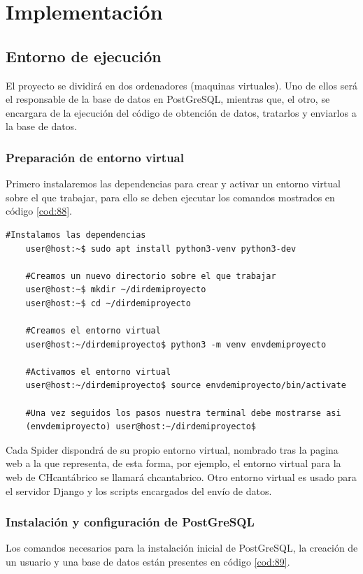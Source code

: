 \chapter[Implementación]{Implementación}
\label{Chap5}

\section{Entorno de ejecución}
El proyecto se dividirá en dos ordenadores (maquinas virtuales). Uno de ellos será el responsable de la base de datos en PostGreSQL, mientras que, el otro, se encargara de la ejecución del código de obtención de datos, tratarlos y enviarlos a la base de datos.

\subsection{Preparación de entorno virtual}
Primero instalaremos las dependencias para crear y activar un entorno virtual sobre el que trabajar, para ello se deben ejecutar los comandos mostrados en código \ref{cod:88}.

\begin{lstlisting}[caption={Instrucciones por consola para la creacion de un entrono virtual}, label=cod:88]
	#Instalamos las dependencias
	user@host:~$ sudo apt install python3-venv python3-dev
	
	#Creamos un nuevo directorio sobre el que trabajar
	user@host:~$ mkdir ~/dirdemiproyecto
	user@host:~$ cd ~/dirdemiproyecto
	
	#Creamos el entorno virtual
	user@host:~/dirdemiproyecto$ python3 -m venv envdemiproyecto
	
	#Activamos el entorno virtual
	user@host:~/dirdemiproyecto$ source envdemiproyecto/bin/activate
	
	#Una vez seguidos los pasos nuestra terminal debe mostrarse asi
	(envdemiproyecto) user@host:~/dirdemiproyecto$
\end{lstlisting}

Cada Spider dispondrá de su propio entorno virtual, nombrado tras la pagina web a la que representa, de esta forma, por ejemplo, el entorno virtual para la web de CHcantábrico se llamará chcantabrico. Otro entorno virtual es usado para el servidor Django y los scripts encargados del envío de datos.

\subsection{Instalación y configuración de PostGreSQL}
Los comandos necesarios para la instalación inicial de PostGreSQL, la creación de un usuario y una base de datos están presentes en código \ref{cod:89}.

